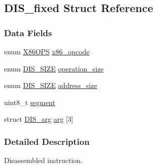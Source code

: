 \hypertarget{struct_d_i_s__fixed}{\subsection{D\-I\-S\-\_\-fixed Struct Reference}
\label{struct_d_i_s__fixed}
}
\subsubsection*{Data Fields}
\begin{DoxyCompactItemize}
\item 
enum \hyperlink{bytecode__disasm_8h_a6bf8b2b4d6261f0e88170a7d0585a5e2}{X86\-O\-P\-S} \hyperlink{struct_d_i_s__fixed_a372354efff5b025dc9324a03625338a2}{x86\-\_\-opcode}
\item 
enum \hyperlink{bytecode__disasm_8h_a6a0d419b6b61630b1f76a25ff39df84d}{D\-I\-S\-\_\-\-S\-I\-Z\-E} \hyperlink{struct_d_i_s__fixed_a1a17e54c88513da8e5b1175a785c51ae}{operation\-\_\-size}
\item 
enum \hyperlink{bytecode__disasm_8h_a6a0d419b6b61630b1f76a25ff39df84d}{D\-I\-S\-\_\-\-S\-I\-Z\-E} \hyperlink{struct_d_i_s__fixed_a772bedb1977f1ae07b9f55991f318bd8}{address\-\_\-size}
\item 
uint8\-\_\-t \hyperlink{struct_d_i_s__fixed_afbf231e07d12db4d0ebf0bc223679ae5}{segment}
\item 
struct \hyperlink{struct_d_i_s__arg}{D\-I\-S\-\_\-arg} \hyperlink{struct_d_i_s__fixed_a0a83d2adc11b69512577cebc2bdc1aa8}{arg} \mbox{[}3\mbox{]}
\end{DoxyCompactItemize}


\subsubsection{Detailed Description}
Disassembled instruction. 

